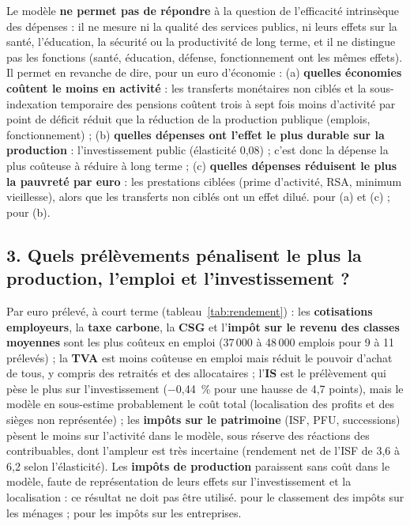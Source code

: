 Le modèle \textbf{ne permet pas de répondre} à la question de l'efficacité intrinsèque des dépenses : il ne mesure ni la
qualité des services publics, ni leurs effets sur la santé, l'éducation, la sécurité ou la productivité de long terme,
et il ne distingue pas les fonctions (santé, éducation, défense, fonctionnement ont les mêmes effets). Il permet en
revanche de dire, pour un euro d'économie : (a) \textbf{quelles économies coûtent le moins en activité} : les transferts
monétaires non ciblés et la sous-indexation temporaire des pensions coûtent trois à sept fois moins d'activité par point
de déficit réduit que la réduction de la production publique (emplois, fonctionnement) ; (b) \textbf{quelles dépenses
ont l'effet le plus durable sur la production} : l'investissement public (élasticité 0,08) ; c'est donc la dépense la
plus coûteuse à réduire à long terme ; (c) \textbf{quelles dépenses réduisent le plus la pauvreté par euro} : les
prestations ciblées (prime d'activité, RSA, minimum vieillesse), alors que les transferts non ciblés ont un effet
dilué.  pour (a) et (c) ;  pour (b).

\subsection*{3. Quels prélèvements pénalisent le plus la production, l'emploi et l'investissement ?}

Par euro prélevé, à court terme (tableau~\ref{tab:rendement}) : les \textbf{cotisations employeurs}, la \textbf{taxe
carbone}, la \textbf{CSG} et l'\textbf{impôt sur le revenu des classes moyennes} sont les plus coûteux en emploi
(37\,000 à 48\,000 emplois pour 9 à 11\md{} prélevés) ; la \textbf{TVA} est moins coûteuse en emploi mais réduit le pouvoir d'achat de
tous, y compris des retraités et des allocataires ; l'\textbf{IS} est le prélèvement qui pèse le plus sur
l'investissement ($-$0,44~\% pour une hausse de 4,7 points), mais le modèle en sous-estime probablement le coût total
(localisation des profits et des sièges non représentée) ; les \textbf{impôts sur le patrimoine} (ISF, PFU,
successions) pèsent le moins sur l'activité dans le modèle, sous réserve des réactions des contribuables, dont l'ampleur
est très incertaine (rendement net de l'ISF de 3,6 à 6,2\md{} selon l'élasticité). Les \textbf{impôts de production}
paraissent sans coût dans le modèle, faute de représentation de leurs effets sur l'investissement et la localisation :
ce résultat ne doit pas être utilisé.  pour le classement des impôts sur les ménages ;
 pour les impôts sur les entreprises.

